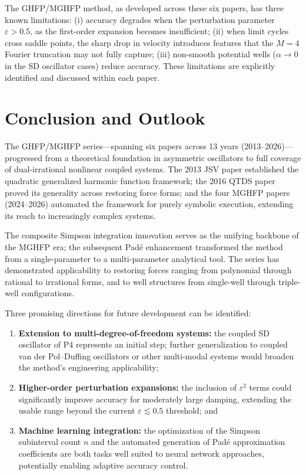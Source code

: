 \documentclass[11pt,a4paper]{article}
\begin{document}
The GHFP/MGHFP method, as developed across these six papers, has three known limitations: (i) accuracy degrades when the perturbation parameter $\varepsilon > 0.5$, as the first-order expansion becomes insufficient; (ii) when limit cycles cross saddle points, the sharp drop in velocity introduces features that the $M = 4$ Fourier truncation may not fully capture; (iii) non-smooth potential wells ($\alpha \to 0$ in the SD oscillator cases) reduce accuracy. These limitations are explicitly identified and discussed within each paper.

\section{Conclusion and Outlook}

The GHFP/MGHFP series---spanning six papers across 13 years (2013--2026)---progressed from a theoretical foundation in asymmetric oscillators to full coverage of dual-irrational nonlinear coupled systems. The 2013 JSV paper established the quadratic generalized harmonic function framework; the 2016 QTDS paper proved its generality across restoring force forms; and the four MGHFP papers (2024--2026) automated the framework for purely symbolic execution, extending its reach to increasingly complex systems.

The composite Simpson integration innovation serves as the unifying backbone of the MGHFP era; the subsequent Pad\'e enhancement transformed the method from a single-parameter to a multi-parameter analytical tool. The series has demonstrated applicability to restoring forces ranging from polynomial through rational to irrational forms, and to well structures from single-well through triple-well configurations.

Three promising directions for future development can be identified:

\begin{enumerate}[leftmargin=2em]
\item \textbf{Extension to multi-degree-of-freedom systems:} the coupled SD oscillator of P4 represents an initial step; further generalization to coupled van der Pol--Duffing oscillators or other multi-modal systems would broaden the method's engineering applicability;

\item \textbf{Higher-order perturbation expansions:} the inclusion of $\varepsilon^2$ terms could significantly improve accuracy for moderately large damping, extending the usable range beyond the current $\varepsilon \lesssim 0.5$ threshold; and

\item \textbf{Machine learning integration:} the optimization of the Simpson subinterval count $n$ and the automated generation of Pad\'e approximation coefficients are both tasks well suited to neural network approaches, potentially enabling adaptive accuracy control.
\end{enumerate}
\end{document}
